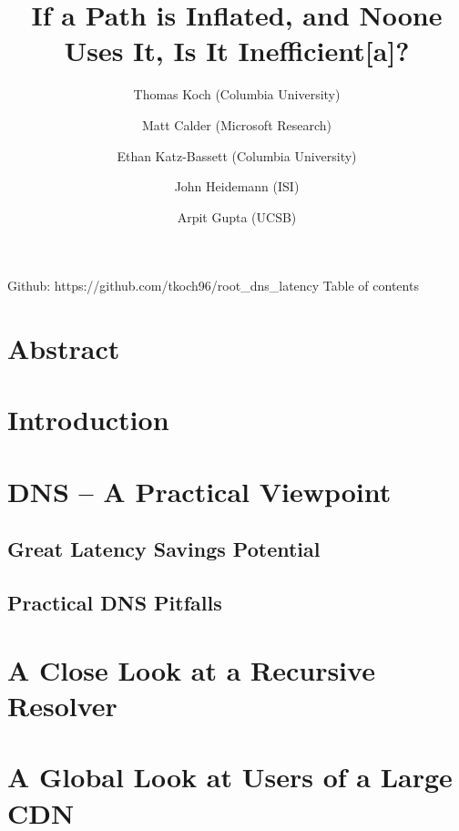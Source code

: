 \documentclass[sigconf,nonacm,10pt]{acmart}
\title{If a Path is Inflated, and Noone Uses It, Is It Inefficient{[}a{]}?}
\author{
            Thomas Koch (Columbia University)
         \and 
            Matt Calder (Microsoft Research)
         \and 
            Ethan Katz-Bassett (Columbia University)
         \and 
            John Heidemann (ISI)
         \and 
            Arpit Gupta (UCSB)
        }
\date{}
\begin{document}
\maketitle

\iffalse

Github: https://github.com/tkoch96/root\_dns\_latency Table of contents

\section*{Abstract}\label{abstract}

\section{Introduction}\label{introduction}

\section{DNS -- A Practical Viewpoint}\label{dns-a-practical-viewpoint}

\subsection{Great Latency Savings
Potential}\label{great-latency-savings-potential}

\subsection{Practical DNS Pitfalls}\label{practical-dns-pitfalls}

\section{A Close Look at a Recursive
Resolver}\label{a-close-look-at-a-recursive-resolver}

\section{A Global Look at Users of a Large
CDN}\label{a-global-look-at-users-of-a-large-cdn}
\end{document}
